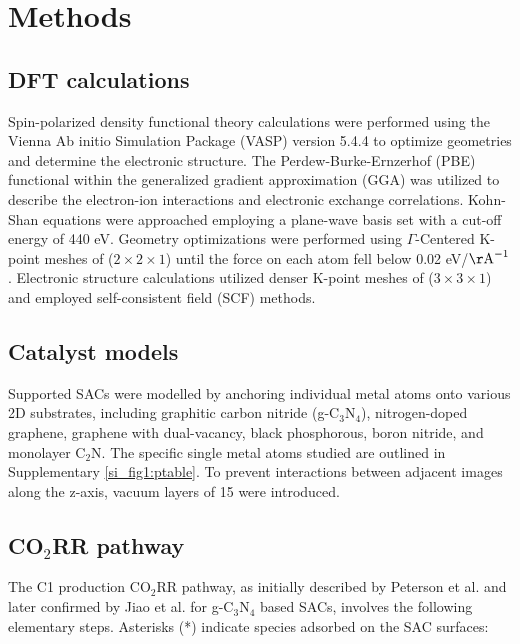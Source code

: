 



\section{Methods}


\subsection{DFT calculations}
Spin-polarized density functional theory calculations were performed using the Vienna Ab initio Simulation Package (VASP) version 5.4.4 \cite{kresse1996efficient, kresse1996efficiency, kresse1993ab} to optimize geometries and determine the electronic structure.
The Perdew-Burke-Ernzerhof (PBE) functional \cite{kresse1996efficient} within the generalized gradient approximation (GGA) \cite{perdew1996generalized} was utilized to describe the electron-ion interactions and electronic exchange correlations.
Kohn-Shan equations were approached employing a plane-wave basis set with a cut-off energy of 440 eV.
Geometry optimizations were performed using $\Gamma$-Centered K-point meshes of ($2\times2\times1$) until the force on each atom fell below 0.02 eV/\(\mathrm{\AA}^{-1}\).
Electronic structure calculations utilized denser K-point meshes of ($3\times3\times1$) and employed self-consistent field (SCF) methods.


\subsection{Catalyst models}
Supported SACs were modelled by anchoring individual metal atoms onto various 2D substrates, including graphitic carbon nitride (g-C$_3$N$_4$), nitrogen-doped graphene, graphene with dual-vacancy, black phosphorous, boron nitride, and monolayer C$_2$N.
The specific single metal atoms studied are outlined in Supplementary \cref{si_fig1:ptable}.
To prevent interactions between adjacent images along the z-axis, vacuum layers of 15 \text{\AA} were introduced.


\subsection{CO$_2$RR pathway}
The C1 production CO$_2$RR pathway, as initially described by Peterson et al. \cite{peterson2010copper} and later confirmed by Jiao et al. \cite{jiao2017molecular} for g-C$_3$N$_4$ based SACs, involves the following elementary steps.
Asterisks (*) indicate species adsorbed on the SAC surfaces:

